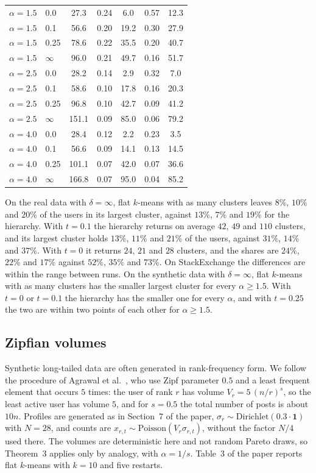 \documentclass[11pt]{article}
\theoremstyle{remark}\newtheorem{remark}{Remark}\renewcommand{\theremark}{S\arabic{remark}}
\begin{document}
\begin{table}[ht]
\begin{tabular}{llccccc}
$\alpha=1.5$ & 0.0 & 27.3 & 0.24 & 6.0 & 0.57 & 12.3 \\
$\alpha=1.5$ & 0.1 & 56.6 & 0.20 & 19.2 & 0.30 & 27.9 \\
$\alpha=1.5$ & 0.25 & 78.6 & 0.22 & 35.5 & 0.20 & 40.7 \\
$\alpha=1.5$ & $\infty$ & 96.0 & 0.21 & 49.7 & 0.16 & 51.7 \\
$\alpha=2.5$ & 0.0 & 28.2 & 0.14 & 2.9 & 0.32 & 7.0 \\
$\alpha=2.5$ & 0.1 & 58.6 & 0.10 & 17.8 & 0.16 & 20.3 \\
$\alpha=2.5$ & 0.25 & 96.8 & 0.10 & 42.7 & 0.09 & 41.2 \\
$\alpha=2.5$ & $\infty$ & 151.1 & 0.09 & 85.0 & 0.06 & 79.2 \\
$\alpha=4.0$ & 0.0 & 28.4 & 0.12 & 2.2 & 0.23 & 3.5 \\
$\alpha=4.0$ & 0.1 & 56.6 & 0.09 & 14.1 & 0.13 & 14.5 \\
$\alpha=4.0$ & 0.25 & 101.1 & 0.07 & 42.0 & 0.07 & 36.6 \\
$\alpha=4.0$ & $\infty$ & 166.8 & 0.07 & 95.0 & 0.04 & 85.2 \\
\bottomrule
\end{tabular}
\end{table}


On the real data with $\delta=\infty$, flat $k$-means with as many clusters leaves $8\%$, $10\%$ and $20\%$ of the users in its largest cluster, against $13\%$, $7\%$ and $19\%$ for the hierarchy. With $t=0.1$ the hierarchy returns on average $42$, $49$ and $110$ clusters, and its largest cluster holds $13\%$, $11\%$ and $21\%$ of the users, against $31\%$, $14\%$ and $37\%$. With $t=0$ it returns $24$, $21$ and $28$ clusters, and the shares are $24\%$, $22\%$ and $17\%$ against $52\%$, $35\%$ and $73\%$. On StackExchange the differences are within the range between runs. On the synthetic data with $\delta=\infty$, flat $k$-means with as many clusters has the smaller largest cluster for every $\alpha\ge1.5$. With $t=0$ or $t=0.1$ the hierarchy has the smaller one for every $\alpha$, and with $t=0.25$ the two are within two points of each other for $\alpha\ge1.5$.

\subsection*{Zipfian volumes}
Synthetic long-tailed data are often generated in rank-frequency form. We follow the procedure of Agrawal et al.~\cite{agrawal2005ppolap}, who use Zipf parameter $0.5$ and a least frequent element that occurs $5$ times: the user of rank $r$ has volume $V_r=5\,(n/r)^s$, so the least active user has volume $5$, and for $s=0.5$ the total number of posts is about $10n$. Profiles are generated as in Section~7 of the paper, $\sigma_r\sim\mathrm{Dirichlet}(0.3\cdot\mathbf 1)$ with $N=28$, and counts are $x_{r,t}\sim\mathrm{Poisson}(V_r\sigma_{r,t})$, without the factor $N/4$ used there. The volumes are deterministic here and not random Pareto draws, so Theorem~3 applies only by analogy, with $\alpha=1/s$. Table~3 of the paper reports flat $k$-means with $k=10$ and five restarts.
\end{document}
